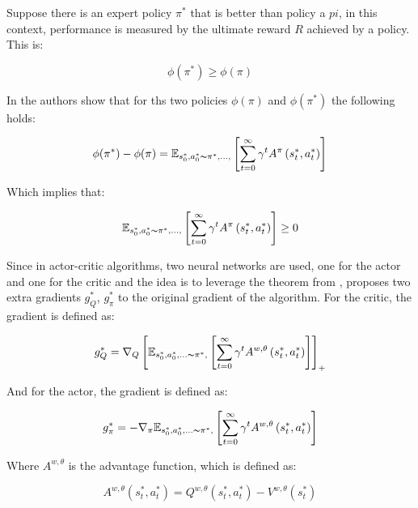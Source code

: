 Suppose there is an expert policy $\pi^*$ that is better than policy a $pi$, in this context, performance is measured by the ultimate reward $R$ achieved by a policy. This is:

\begin{equation*}
    \phi(\pi^*) \geq \phi(\pi)
\end{equation*}

In \cite{TD3} the authors show that for ths two policies $\phi(\pi)$ and $\phi(\pi^*)$ the following holds:

\begin{equation*}
   \phi(\pi^*) - \phi(\pi) = \mathbb{E}_{s_{0}^{*},a_{0}^{*}\thicksim\pi^*,...,}\left[\sum_{t=0}^{\infty}\gamma^t A^\pi \left( s_{t}^{*}, a_{t}^{*}\right)\right] 
\end{equation*}

Which implies that:

\begin{equation}
    \label{eq:proff_of_transferable_knowledge}
    \mathbb{E}_{s_{0}^{*},a_{0}^{*}\thicksim\pi^*,...,}\left[\sum_{t=0}^{\infty}\gamma^t A^\pi \left( s_{t}^{*}, a_{t}^{*}\right)\right] \geq 0
\end{equation}

Since in actor-critic algorithms, two neural networks are used, one for the actor and one for the critic and the idea is to leverage the theorem from , \cite{pretraining_tl} proposes two extra gradients $g^*_Q$, $g^*_\pi$ to the original gradient of the algorithm. For the critic, the gradient is defined as:

\begin{equation*}
    g_{Q}^{*} = \nabla_{Q} \left[
         \mathbb{E}_{s_{0}^{*},a_{0}^{*},...\thicksim\pi^*,}\left[\sum_{t=0}^{\infty} \gamma^t A^{w,\theta} \left( s_{t}^{*}, a_{t}^{*}\right)\right]
    \right]_{+}
\end{equation*}

And for the actor, the gradient is defined as:

\begin{equation*}
    g_{\pi}^{*} = -\nabla_{\pi} \mathbb{E}_{s_{0}^{*},a_{0}^{*},...\thicksim\pi^*,}\left[\sum_{t=0}^{\infty} \gamma^t A^{w,\theta} \left( s_{t}^{*}, a_{t}^{*}\right)\right]
\end{equation*}

Where $A^{w,\theta}$ is the advantage function, which is defined as:

\begin{equation*}
    A^{w,\theta} \left( s_{t}^{*}, a_{t}^{*}\right) = Q^{w,\theta} \left( s_{t}^{*}, a_{t}^{*}\right) - V^{w,\theta} \left( s_{t}^{*}\right)
\end{equation*}

